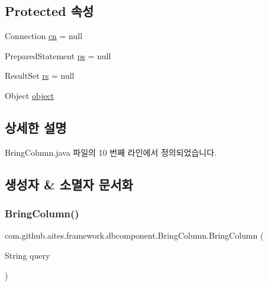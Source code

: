\subsection*{Protected 속성}
\begin{DoxyCompactItemize}
\item 
Connection \mbox{\hyperlink{classcom_1_1github_1_1aites_1_1framework_1_1globalknowledge_1_1_d_b_connector_af00c95ca08c2b39cb47ee4286e9f2469}{cn}} = null
\item 
Prepared\+Statement \mbox{\hyperlink{classcom_1_1github_1_1aites_1_1framework_1_1globalknowledge_1_1_d_b_connector_a2a6dbc151015e5fe147a4d155ae7a145}{ps}} = null
\item 
Result\+Set \mbox{\hyperlink{classcom_1_1github_1_1aites_1_1framework_1_1globalknowledge_1_1_d_b_connector_a36c87b41d86e8382bea688b2ca209764}{rs}} = null
\item 
Object \mbox{\hyperlink{classcom_1_1github_1_1aites_1_1framework_1_1globalknowledge_1_1_d_b_connector_ab6f6f9f00c22d311dca48a3a424fd6a3}{object}}
\end{DoxyCompactItemize}


\subsection{상세한 설명}


Bring\+Column.\+java 파일의 10 번째 라인에서 정의되었습니다.



\subsection{생성자 \& 소멸자 문서화}
\mbox{\label{classcom_1_1github_1_1aites_1_1framework_1_1dbcomponent_1_1_bring_column_a603ecee3a519d940bcde4a5607f72c3a}} 
\subsubsection{\texorpdfstring{Bring\+Column()}{BringColumn()}}
{\footnotesize\ttfamily com.\+github.\+aites.\+framework.\+dbcomponent.\+Bring\+Column.\+Bring\+Column (\begin{DoxyParamCaption}\item[{String}]{query }\end{DoxyParamCaption})}



